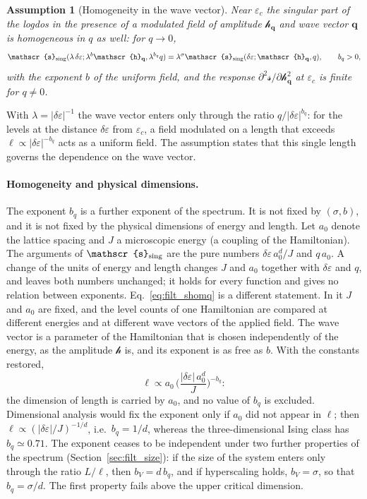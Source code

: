 \documentclass[10pt,a4paper]{article}
\theoremstyle{plain}
\newtheorem{assumption}{Assumption}
\newcommand{\lndos}{{logdos}}  %
\newcommand{\hfield}{\mathscr{h}}  %
\newcommand{\lds}{\mathscr{s}}  %
\begin{document}
\begin{assumption}[Homogeneity in the wave vector]\label{ass:q}
Near $\varepsilon_c$ the singular part of the \lndos{} in the presence of a
modulated field of amplitude $\hfield_{\mathbf q}$ and wave vector
$\mathbf q$ is homogeneous in $q$ as well: for $q\to0$,
\begin{equation}\label{eq:filt_shomq}
  \lds_{\rm sing}(\lambda\,\delta\varepsilon;\lambda^{b}\hfield_{\mathbf q},\lambda^{b_q}q)
  =\lambda^{\sigma}\lds_{\rm sing}(\delta\varepsilon;\hfield_{\mathbf q},q) ,
  \qquad b_q>0 ,
\end{equation}
with the exponent $b$ of the uniform field, and the response
$\partial^{2}\lds/\partial\hfield_{\mathbf q}^{2}$ at $\varepsilon_c$ is finite
for $q\neq0$.
\end{assumption}
With $\lambda=|\delta\varepsilon|^{-1}$ the wave vector enters only through
the ratio $q/|\delta\varepsilon|^{b_q}$: for the levels at the distance
$\delta\varepsilon$ from $\varepsilon_c$, a field modulated on a length that
exceeds $\ell\propto|\delta\varepsilon|^{-b_q}$ acts as a uniform field. The
assumption states that this single length governs the dependence on the wave
vector.

\paragraph{Homogeneity and physical dimensions.} The exponent $b_q$ is a
further exponent of the spectrum. It is not fixed by $(\sigma,b)$, and it is
not fixed by the physical dimensions of energy and length. Let $a_0$ denote
the lattice spacing and $J$ a microscopic energy (a coupling of the
Hamiltonian). The arguments of $\lds_{\rm sing}$ are the pure numbers
$\delta\varepsilon\,a_0^{d}/J$ and $q\,a_0$. A change of the units of energy
and length changes $J$ and $a_0$ together with $\delta\varepsilon$ and $q$,
and leaves both numbers unchanged; it holds for every function and gives no
relation between exponents. Eq.~\eqref{eq:filt_shomq} is a different
statement. In it $J$ and $a_0$ are fixed, and the level counts of one
Hamiltonian are compared at different energies and at different wave vectors
of the applied field. The wave vector is a parameter of the Hamiltonian that
is chosen independently of the energy, as the amplitude $\hfield$ is, and its
exponent is as free as $b$. With the constants restored,
\[
  \ell\propto a_0\,\Big(\frac{|\delta\varepsilon|\,a_0^{d}}{J}\Big)^{-b_q} :
\]
the dimension of length is carried by $a_0$, and no value of $b_q$ is
excluded. Dimensional analysis would fix the exponent only if $a_0$ did not
appear in $\ell$; then $\ell\propto(|\delta\varepsilon|/J)^{-1/d}$, i.e.\
$b_q=1/d$, whereas the three-dimensional Ising class has $b_q\simeq0.71$.
The exponent ceases to be independent under two further properties of the
spectrum (Section~\ref{sec:filt_size}): if the size of the system enters
only through the ratio $L/\ell$, then $b_V=d\,b_q$, and if hyperscaling
holds, $b_V=\sigma$, so that $b_q=\sigma/d$. The first property fails above
the upper critical dimension.
\end{document}
